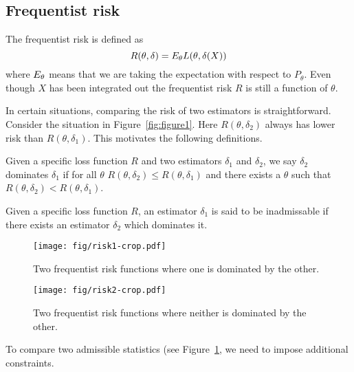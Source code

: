 \documentclass[twoside]{article}
\begin{document}
\subsection{Frequentist risk}

The frequentist risk is defined as
\begin{equation}
R(\theta, \delta) = E_{\theta} L(\theta, \delta(X))
\end{equation}
where $E_{\theta}$ means that we are taking the expectation with respect to
$P_{\theta}$. Even though $X$ has been integrated out the frequentist risk
$R$ is still a function of $\theta$.

In certain situations, comparing the risk of two estimators is straightforward.
Consider the situation in Figure~\ref{fig:figure1}.  Here $R(\theta, \delta_2)$
always has lower risk than $R(\theta, \delta_1)$.  This motivates the following
definitions.

\begin{definition}\label{def:dominate}
  Given a specific loss function $R$ and two estimators $\delta_1$ and $\delta_2$,
  we say $\delta_2$ dominates $\delta_1$ if for all $\theta$ $R(\theta, \delta_2)
  \leq R(\theta, \delta_1)$ and there exists a $\theta$ such that $R(\theta,
  \delta_2) < R(\theta, \delta_1)$.
\end{definition}

\begin{definition}\label{def:inadmissable}
  Given a specific loss function $R$, an estimator $\delta_1$ is said to be
  inadmissable if there exists an estimator $\delta_2$ which dominates it. 
\end{definition}

\begin{figure}[ht]
\begin{minipage}[b]{0.45\linewidth}
\centering
\texttt{[image: fig/risk1-crop.pdf]}
\caption{Two frequentist risk functions where one is dominated by the other.}
\label{fig:figure1}
\end{minipage}
\hspace{0.5cm}
\begin{minipage}[b]{0.45\linewidth}
\centering
\texttt{[image: fig/risk2-crop.pdf]}
\caption{Two frequentist risk functions where neither is dominated by the other.}
\label{fig:figure2}
\end{minipage}
\end{figure}

To compare two admissible statistics (see Figure~\ref{fig:figure2}, we need
to impose additional constraints.
\end{document}
